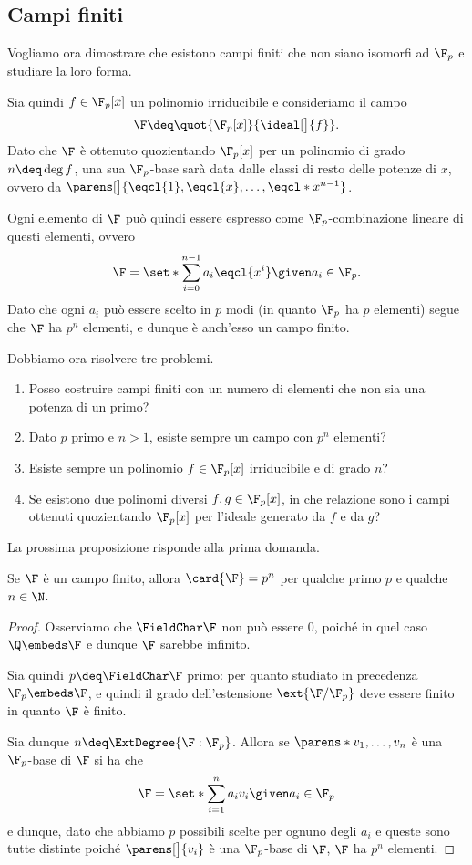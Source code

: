 \subsection{Campi finiti}

Vogliamo ora dimostrare che esistono campi finiti che non siano isomorfi ad $\F_p$ e studiare la loro forma.

Sia quindi $f \in \F_p[x]$ un polinomio irriducibile e consideriamo il campo \[
    \F \deq \quot{\F_p[x]}{\ideal[\big]{f}}.
\] Dato che $\F$ è ottenuto quozientando $\F_p[x]$ per un polinomio di grado $n \deq \deg f$, una sua $\F_p$-base sarà data dalle classi di resto delle potenze di $x$, ovvero da $\parens[\big]{\eqcl{1}, \eqcl{x}, \dots, \eqcl*{x^{n-1}}}$.

Ogni elemento di $\F$ può quindi essere espresso come $\F_p$-combinazione lineare di questi elementi, ovvero \[
    \F = \set*{\sum_{i=0}^{n-1} a_i\eqcl{x^i} \given a_i \in \F_p}.
\] Dato che ogni $a_i$ può essere scelto in $p$ modi (in quanto $\F_p$ ha $p$ elementi) segue che $\F$ ha $p^n$ elementi, e dunque è anch'esso un campo finito.

Dobbiamo ora risolvere tre problemi.
\begin{enumerate}[(1)]
    \item Posso costruire campi finiti con un numero di elementi che non sia una potenza di un primo?
    \item Dato $p$ primo e $n > 1$, esiste sempre un campo con $p^n$ elementi? 
    \item Esiste sempre un polinomio $f \in \F_p[x]$ irriducibile e di grado $n$? 
    \item Se esistono due polinomi diversi $f, g \in \F_p[x]$, in che relazione sono i campi ottenuti quozientando $\F_p[x]$ per l'ideale generato da $f$ e da $g$?   
\end{enumerate}

La prossima proposizione risponde alla prima domanda.
\begin{proposition}
    {}{}
    Se $\F$ è un campo finito, allora $\card{\F} = p^n$ per qualche primo $p$ e qualche $n \in \N$. 
\end{proposition}
\begin{proof}
    Osserviamo che $\FieldChar \F$ non può essere $0$, poiché in quel caso $\Q \embeds \F$ e dunque $\F$ sarebbe infinito.

    Sia quindi $p \deq \FieldChar \F$ primo: per quanto studiato in precedenza $\F_p \embeds \F$, e quindi il grado dell'estensione $\ext{\F / \F_p}$ deve essere finito in quanto $\F$ è finito.
    
    Sia dunque $n \deq \ExtDegree{\F:\F_p}$. Allora se $\parens*{v_1, \dots, v_n}$ è una $\F_p$-base di $\F$ si ha che \[
        \F = \set*{\sum_{i=1}^n a_iv_i \given a_i \in \F_p}
    \] e dunque, dato che abbiamo $p$ possibili scelte per ognuno degli $a_i$ e queste sono tutte distinte poiché $\parens[\big]{v_i}$ è una $\F_p$-base di $\F$, $\F$ ha $p^n$ elementi.
\end{proof}

